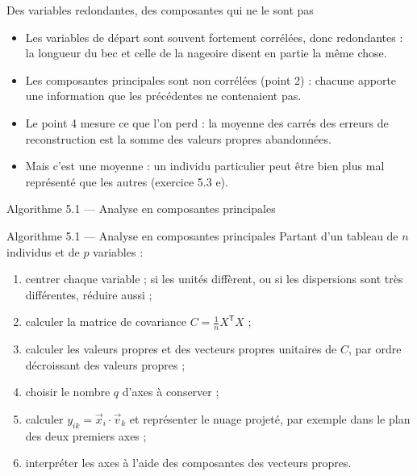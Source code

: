 \begin{frame}{Des variables redondantes, des composantes qui ne le sont pas}
  \begin{itemize}
    \item Les variables de départ sont souvent fortement corrélées, donc
      redondantes : la longueur du bec et celle de la nageoire disent en
      partie la même chose.
    \item Les composantes principales sont non corrélées (point 2) : chacune
      apporte une information que les précédentes ne contenaient pas.
    \item Le point 4 mesure ce que l'on perd : la moyenne des carrés des
      erreurs de reconstruction est la somme des valeurs propres
      abandonnées.
    \item Mais c'est une moyenne : un individu particulier peut être bien
      plus mal représenté que les autres (exercice 5.3 e).
  \end{itemize}
\end{frame}

\begin{frame}{Algorithme 5.1 --- Analyse en composantes principales}
  \begin{Algo}{Algorithme 5.1 --- Analyse en composantes principales}
    Partant d'un tableau de $n$ individus et de $p$ variables :
    \begin{enumerate}
      \item centrer chaque variable ; si les unités diffèrent, ou si les
        dispersions sont très différentes, réduire aussi ;
      \item calculer la matrice de covariance $C=\frac1nX^{\mathsf T}X$ ;
      \item calculer les valeurs propres et des vecteurs propres unitaires
        de $C$, par ordre décroissant des valeurs propres ;
      \item choisir le nombre $q$ d'axes à conserver ;
      \item calculer $y_{ik}=\vec x_i\cdot\vec v_k$ et représenter le nuage
        projeté, par exemple dans le plan des deux premiers axes ;
      \item interpréter les axes à l'aide des composantes des vecteurs
        propres.
    \end{enumerate}
  \end{Algo}
\end{frame}

